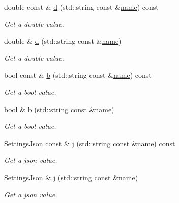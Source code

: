 \begin{DoxyCompactItemize}
double const  \& \hyperlink{class_settings_json_a7105095d0de83e43728f14544a698fc6}{d} (std\+::string const \&\hyperlink{class_settings_json_a301eda8c47d1140298fade3907c723d6}{name}) const
\begin{DoxyCompactList}\small\item\em Get a double value. \end{DoxyCompactList}\item 
double \& \hyperlink{class_settings_json_a29dcf05e16ab9ecb60c48e7a7e0b4fe5}{d} (std\+::string const \&\hyperlink{class_settings_json_a301eda8c47d1140298fade3907c723d6}{name})
\begin{DoxyCompactList}\small\item\em Get a double value. \end{DoxyCompactList}\item 
bool const  \& \hyperlink{class_settings_json_a347ec6bd738a36b96b2eccab0bae5a32}{b} (std\+::string const \&\hyperlink{class_settings_json_a301eda8c47d1140298fade3907c723d6}{name}) const
\begin{DoxyCompactList}\small\item\em Get a bool value. \end{DoxyCompactList}\item 
bool \& \hyperlink{class_settings_json_aa5ff7200ce8ae660ab3c7c2172040147}{b} (std\+::string const \&\hyperlink{class_settings_json_a301eda8c47d1140298fade3907c723d6}{name})
\begin{DoxyCompactList}\small\item\em Get a bool value. \end{DoxyCompactList}\item 
\hyperlink{class_settings_json}{Settings\+Json} const  \& \hyperlink{class_settings_json_a08a5b1f37b4d3d331d0511804d16d162}{j} (std\+::string const \&\hyperlink{class_settings_json_a301eda8c47d1140298fade3907c723d6}{name}) const
\begin{DoxyCompactList}\small\item\em Get a json value. \end{DoxyCompactList}\item 
\hyperlink{class_settings_json}{Settings\+Json} \& \hyperlink{class_settings_json_a82fa95fc018937756569c75e6bf6cd83}{j} (std\+::string const \&\hyperlink{class_settings_json_a301eda8c47d1140298fade3907c723d6}{name})
\begin{DoxyCompactList}\small\item\em Get a json value. \end{DoxyCompactList}\item 

\end{DoxyCompactItemize}

